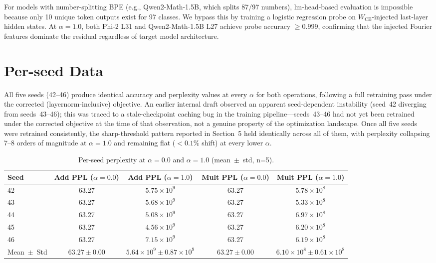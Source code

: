 \documentclass{article}
\begin{document}
For models with number-splitting BPE (e.g., Qwen2-Math-1.5B, which splits
87/97 numbers), lm-head-based evaluation is impossible because only 10
unique token outputs exist for 97 classes.  We bypass this by training a
logistic regression probe on $W_{\text{CE}}$-injected last-layer hidden
states.  At $\alpha=1.0$, both Phi-2 L31 and Qwen2-Math-1.5B L27 achieve
probe accuracy $\geq 0.999$, confirming that the injected Fourier features
dominate the residual regardless of target model architecture.

\section{Per-seed Data}
\label{app:seeds}

All five seeds (42--46) produce identical accuracy and perplexity values at
every $\alpha$ for both operations, following a full retraining pass under the
corrected (layernorm-inclusive) objective.  An earlier internal draft observed
an apparent seed-dependent instability (seed~42 diverging from
seeds~43--46); this was traced to a stale-checkpoint caching bug in the
training pipeline---seeds~43--46 had not yet been retrained under the
corrected objective at the time of that observation, not a genuine property
of the optimization landscape.  Once all five seeds were retrained
consistently, the sharp-threshold pattern reported in Section~5 held
identically across all of them, with perplexity collapsing 7--8 orders of
magnitude at $\alpha = 1.0$ and remaining flat ($< 0.1\%$ shift) at every
lower $\alpha$.

\begin{table}[ht]
  \centering
  \caption{Per-seed perplexity at $\alpha=0.0$ and $\alpha=1.0$ (mean~$\pm$~std, n=5).}
  \label{tab:seed_ppl}
  \begin{tabular}{lcccc}
    \toprule
    Seed & Add PPL ($\alpha=0.0$) & Add PPL ($\alpha=1.0$) & Mult PPL ($\alpha=0.0$) & Mult PPL ($\alpha=1.0$) \\
    \midrule
    42 & 63.27 & $5.75 \times 10^{9}$ & 63.27 & $5.78 \times 10^{8}$ \\
    43 & 63.27 & $5.68 \times 10^{9}$ & 63.27 & $5.33 \times 10^{8}$ \\
    44 & 63.27 & $5.08 \times 10^{9}$ & 63.27 & $6.97 \times 10^{8}$ \\
    45 & 63.27 & $4.56 \times 10^{9}$ & 63.27 & $6.20 \times 10^{8}$ \\
    46 & 63.27 & $7.15 \times 10^{9}$ & 63.27 & $6.19 \times 10^{8}$ \\
    \midrule
    Mean~$\pm$~Std & $63.27 \pm 0.00$ & $5.64 \times 10^{9} \pm 0.87 \times 10^{9}$ & $63.27 \pm 0.00$ & $6.10 \times 10^{8} \pm 0.61 \times 10^{8}$ \\
    \bottomrule
  \end{tabular}
\end{table}
\end{document}
